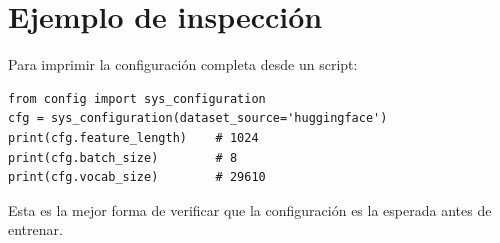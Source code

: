 \section{Ejemplo de inspección}

Para imprimir la configuración completa desde un script:

\begin{verbatim}
from config import sys_configuration
cfg = sys_configuration(dataset_source='huggingface')
print(cfg.feature_length)    # 1024
print(cfg.batch_size)        # 8
print(cfg.vocab_size)        # 29610
\end{verbatim}

\noindent Esta es la mejor forma de verificar que la
configuración es la esperada antes de entrenar.
